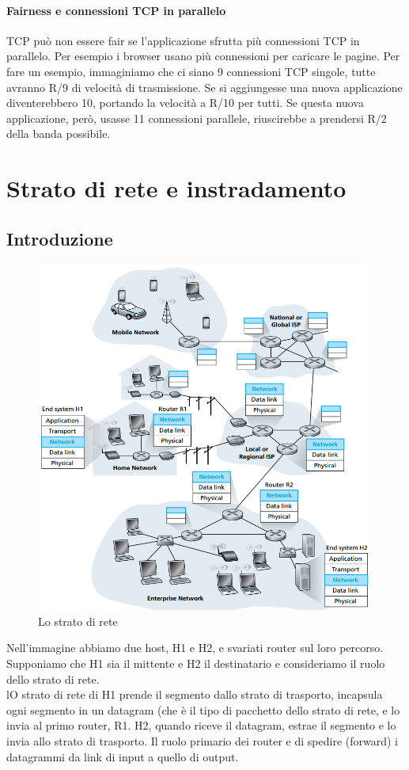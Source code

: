 \documentclass[11pt,a4paper]{article}
\begin{document}
\paragraph{Fairness e connessioni TCP in parallelo}
TCP può non essere fair se l'applicazione sfrutta più connessioni TCP in parallelo. Per esempio i browser usano più connessioni per caricare le pagine. Per fare un esempio, immaginiamo che ci siano 9 connessioni TCP singole, tutte avranno R/9 di velocità di trasmissione. Se si aggiungesse una nuova applicazione diventerebbero 10, portando la velocità a R/10 per tutti. Se questa nuova applicazione, però, usasse 11 connessioni parallele, riuscirebbe a prendersi R/2 della banda possibile.

\section{Strato di rete e instradamento}
\subsection{Introduzione}
\begin{figure}
	\includegraphics[scale=0.6]{img/049.png}
	\caption{Lo strato di rete}
\end{figure}
Nell'immagine abbiamo due host, H1 e H2, e svariati router sul loro percorso. Supponiamo che H1 sia il mittente e H2 il destinatario e consideriamo il ruolo dello strato di rete. \\
lO strato di rete di H1 prende il segmento dallo strato di trasporto, incapsula ogni segmento in un datagram (che è il tipo di pacchetto dello strato di rete, e lo invia al primo router, R1. H2, quando riceve il datagram, estrae il segmento e lo invia allo strato di trasporto. Il ruolo primario dei router e di spedire (forward) i datagrammi da link di input a quello di output.
\end{document}

